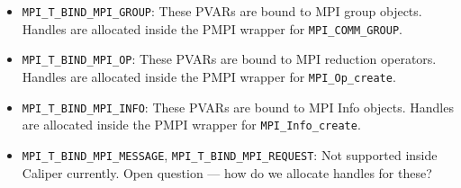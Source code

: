 \begin{itemize}
\begin{itemize}
			\item \verb+MPI_T_BIND_MPI_GROUP+: These PVARs are bound to MPI group objects. Handles are allocated inside the PMPI wrapper for \verb+MPI_COMM_GROUP+.
			\item \verb+MPI_T_BIND_MPI_OP+: These PVARs are bound to MPI reduction operators. Handles are allocated inside the PMPI wrapper for \verb+MPI_Op_create+.
			\item \verb+MPI_T_BIND_MPI_INFO+: These PVARs are bound to MPI Info objects. Handles are allocated inside the PMPI wrapper for \verb+MPI_Info_create+.
			\item \verb+MPI_T_BIND_MPI_MESSAGE+, \verb+MPI_T_BIND_MPI_REQUEST+: Not supported inside Caliper currently. Open question --- how do we allocate handles for these?
		\end{itemize}
\end{itemize}
